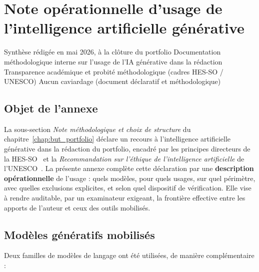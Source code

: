 
\chapter{Note opérationnelle d'usage de l'intelligence artificielle générative}
\label{annex:usage-ia}

\annexefiche
  {Synthèse rédigée en mai 2026, à la clôture du portfolio}
  {Documentation méthodologique interne sur l'usage de l'IA générative dans la rédaction}
  {Transparence académique et probité méthodologique (cadres HES-SO / UNESCO)}
  {Aucun caviardage (document déclaratif et méthodologique)}

\section*{Objet de l'annexe}

La sous-section \emph{Note méthodologique et choix de structure} du chapitre~\ref{chap:but_portfolio} déclare un recours à l'intelligence artificielle générative dans la rédaction du portfolio, encadré par les principes directeurs de la HES-SO~\citep{hessoIA2025} et la \emph{Recommandation sur l'éthique de l'intelligence artificielle} de l'UNESCO~\citep{unescoIA2022}. La présente annexe complète cette déclaration par une \textbf{description opérationnelle} de l'usage : quels modèles, pour quels usages, sur quel périmètre, avec quelles exclusions explicites, et selon quel dispositif de vérification. Elle vise à rendre auditable, par un examinateur exigeant, la frontière effective entre les apports de l'auteur et ceux des outils mobilisés.

\section{Modèles génératifs mobilisés}

Deux familles de modèles de langage ont été utilisées, de manière complémentaire :

